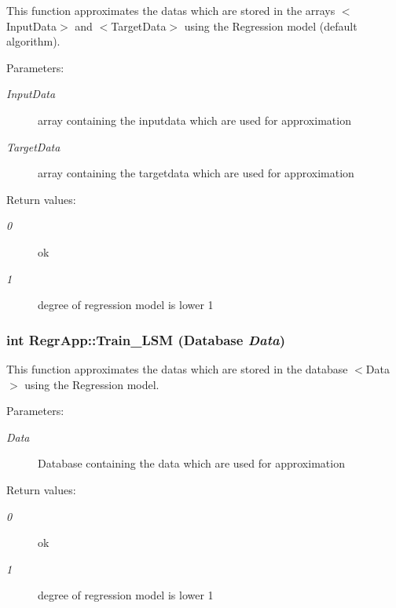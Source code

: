 This function approximates the datas which are stored in the arrays $<$Input\-Data$>$ and $<$Target\-Data$>$ using the Regression model (default algorithm). 

\begin{Desc}
\item[Parameters:]
\begin{description}
\item[{\em Input\-Data}]array containing the inputdata which are used for approximation \item[{\em Target\-Data}]array containing the targetdata which are used for approximation \end{description}
\end{Desc}
\begin{Desc}
\item[Return values:]
\begin{description}
\item[{\em 0}]ok \item[{\em 1}]degree of regression model is lower 1 \end{description}
\end{Desc}
\subsubsection{\setlength{\rightskip}{0pt plus 5cm}int Regr\-App::Train\_\-LSM (Database {\em Data})}\label{classRegrApp_1775e256632e522ff256f499eb2fa165}


This function approximates the datas which are stored in the database $<$Data$>$ using the Regression model. 

\begin{Desc}
\item[Parameters:]
\begin{description}
\item[{\em Data}]Database containing the data which are used for approximation \end{description}
\end{Desc}
\begin{Desc}
\item[Return values:]
\begin{description}
\item[{\em 0}]ok \item[{\em 1}]degree of regression model is lower 1 \end{description}
\end{Desc}

